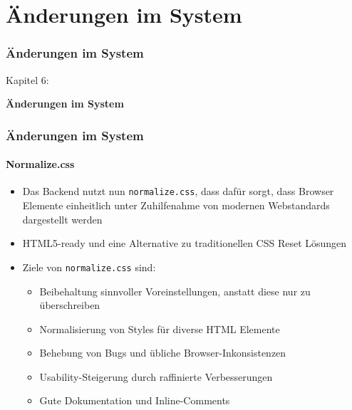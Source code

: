 %

\section{Änderungen im System}
\begin{frame}[fragile]
	\frametitle{Änderungen im System}

	\begin{center}\huge{Kapitel 6:}\end{center}
	\begin{center}\huge{\color{typo3darkgrey}\textbf{Änderungen im System}}\end{center}

\end{frame}


\begin{frame}[fragile]
	\frametitle{Änderungen im System}
	\framesubtitle{Normalize.css}

	\begin{itemize}
		\item Das Backend nutzt nun \texttt{normalize.css}, dass dafür sorgt, dass Browser Elemente einheitlich unter Zuhilfenahme von modernen Webstandards dargestellt werden
		\item HTML5-ready und eine Alternative zu traditionellen CSS Reset Lösungen
		\item Ziele von \texttt{normalize.css} sind:

			\begin{itemize}
				\item Beibehaltung sinnvoller Voreinstellungen, anstatt diese nur zu überschreiben
				\item Normalisierung von Styles für diverse HTML Elemente 
				\item Behebung von Bugs und übliche Browser-Inkonsistenzen
				\item Usability-Steigerung durch raffinierte Verbesserungen
				\item Gute Dokumentation und Inline-Comments
			\end{itemize}

	\end{itemize}

\end{frame}

